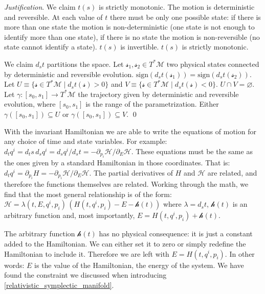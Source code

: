 \documentclass[aps,pra,10pt,twocolumn,floatfix,nofootinbib]{revtex4-1}
\numberwithin{equation}{section}
\theoremstyle{definition}
\newenvironment{justification}{\emph{Justification}.}{\qed}
\begin{document}
\begin{justification}
	We claim $t(s)$ is strictly monotonic. The motion is deterministic and reversible. At each value of $t$ there must be only one possible state: if there is more than one state the motion is non-deterministic (one state is not enough to identify more than one state), if there is no state the motion is non-reversible (no state cannot identify a state). $t(s)$ is invertible. $t(s)$ is strictly monotonic.
	
	We claim $d_{s}t$ partitions the space. Let $\mathcal{s}_1, \mathcal{s}_2 \in T^*\mathcal{M}$ two physical states connected by deterministic and reversible evolution. $\mathrm{sign}(d_{s}t(\mathcal{s}_1)) = \mathrm{sign}(d_{s}t(\mathcal{s}_2))$. Let $U \equiv \{\mathcal{s} \in T^*\mathcal{M} \; | \; d_{s}t(\mathcal{s}) > 0 \}$ and $V \equiv \{\mathcal{s} \in T^*\mathcal{M} \; | \; d_{s}t(\mathcal{s}) < 0 \}$. $U \cap V = \varnothing$. Let $\gamma : [s_0, s_1] \rightarrow T^*\mathcal{M}$ the trajectory given by deterministic and reversible evolution, where $[s_0, s_1]$ is the range of the parametrization. Either $\gamma([s_0, s_1]) \subseteq U$ or $\gamma([s_0, s_1]) \subseteq V$.
\end{justification}

With the invariant Hamiltonian we are able to write the equations of motion for any choice of time and state variables. For example: $d_t q^i = d_t s \, d_s q^i = d_s q^i / d_s t = - \partial_{p_i} \mathcal{H} / \partial_{E} \mathcal{H}$. These equations must be the same as the ones given by a standard Hamiltonian in those coordinates. That is: $d_t q^i = \partial_{p_i} H = - \partial_{p_i} \mathcal{H} / \partial_{E} \mathcal{H}$. The partial derivatives of $H$ and $\mathcal{H}$ are related, and therefore the functions themselves are related. Working through the math, we find that the most general relationship is of the form: $\mathcal{H} = \lambda(t,E,q^i,p_i) \, (H(t,q^i,p_i) - E - \mathcal{h}(t))$ where $\lambda = d_s t$, $\mathcal{h}(t)$ is an arbitrary function and, most importantly, $E = H(t,q^i,p_i) + \mathcal{h}(t)$.

The arbitrary function $\mathcal{h}(t)$ has no physical consequence: it is just a constant added to the Hamiltonian. We can either set it to zero or simply redefine the Hamiltonian to include it. Therefore we are left with $E = H(t,q^i,p_i)$. In other words: $E$ is the value of the Hamiltonian, the energy of the system. We have found the constraint we discussed when introducing \ref{relativistic_symplectic_manifold}.
\end{document}
